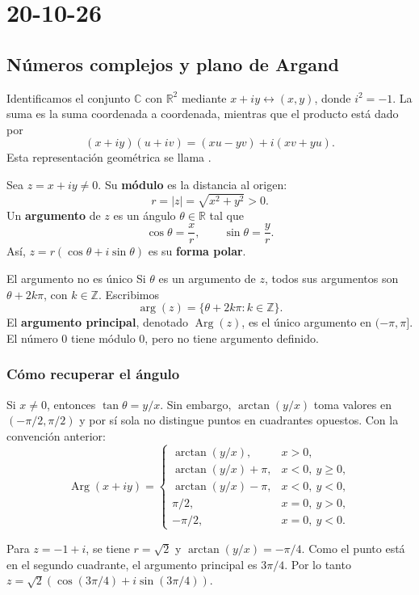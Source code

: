 \chapter{20-10-26}
\section{Números complejos y plano de Argand}

Identificamos el conjunto $\mathbb C$ con $\mathbb R^2$ mediante
$x+iy\longleftrightarrow(x,y)$, donde $i^2=-1$. La suma es la suma
coordenada a coordenada, mientras que el producto está dado por
\[
(x+iy)(u+iv)=(xu-yv)+i(xv+yu).
\]
Esta representación geométrica se llama .

\begin{definicion}[{title={Módulo y argumento}}]
Sea $z=x+iy\neq0$. Su \textbf{módulo} es la distancia al origen:
\[
r=|z|=\sqrt{x^2+y^2}>0.
\]
Un \textbf{argumento} de $z$ es un ángulo $\theta\in\mathbb R$ tal que
\[
\cos\theta=\frac{x}{r},\qquad \sin\theta=\frac{y}{r}.
\]
Así, $z=r(\cos\theta+i\sin\theta)$ es su \textbf{forma polar}.
\end{definicion}

\begin{nota}{El argumento no es único}
Si $\theta$ es un argumento de $z$, todos sus argumentos son
$\theta+2k\pi$, con $k\in\mathbb Z$. Escribimos
\[
\arg(z)=\{\theta+2k\pi:k\in\mathbb Z\}.
\]
El \textbf{argumento principal}, denotado $\operatorname{Arg}(z)$, es el
único argumento en $(-\pi,\pi]$. El número $0$ tiene módulo $0$, pero
no tiene argumento definido.
\end{nota}

\subsection{Cómo recuperar el ángulo}
Si $x\neq0$, entonces $\tan\theta=y/x$. Sin embargo,
$\arctan(y/x)$ toma valores en $(-\pi/2,\pi/2)$ y por sí sola no
distingue puntos en cuadrantes opuestos. Con la convención anterior:
\[
\operatorname{Arg}(x+iy)=
\begin{cases}
\arctan(y/x),&x>0,\\
\arctan(y/x)+\pi,&x<0,\ y\geq0,\\
\arctan(y/x)-\pi,&x<0,\ y<0,\\
\pi/2,&x=0,\ y>0,\\
-\pi/2,&x=0,\ y<0.
\end{cases}
\]
\begin{ejemplo}
Para $z=-1+i$, se tiene $r=\sqrt2$ y $\arctan(y/x)=-\pi/4$.
Como el punto está en el segundo cuadrante, el argumento principal
es $3\pi/4$. Por lo tanto
$z=\sqrt2(\cos(3\pi/4)+i\sin(3\pi/4))$.
\end{ejemplo}

